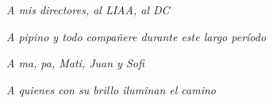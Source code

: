 \vspace*{\fill}

\hfill\textit{A mis directores, al LIAA, al DC}

\hfill\textit{A pipino y todo compañere durante este largo período}

\hfill\textit{A ma, pa, Mati, Juan y Sofi}

\hfill\textit{A quienes con su brillo iluminan el camino}
